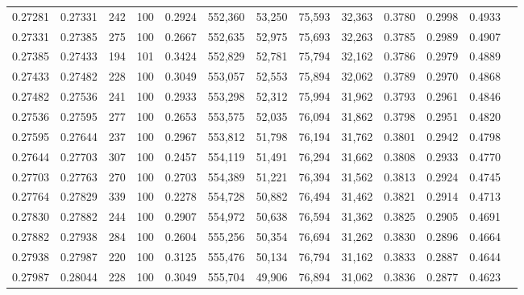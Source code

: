 \begin{tabular}{rrrrrrrrrrrrr}
0.27281 & 0.27331 &   242 & 100 &                                     0.2924 & 552,360 &  53,250 &  75,593 &  32,363 & 0.3780 & 0.2998 & 0.4933 \\
0.27331 & 0.27385 &   275 & 100 &                                     0.2667 & 552,635 &  52,975 &  75,693 &  32,263 & 0.3785 & 0.2989 & 0.4907 \\
0.27385 & 0.27433 &   194 & 101 &                                     0.3424 & 552,829 &  52,781 &  75,794 &  32,162 & 0.3786 & 0.2979 & 0.4889 \\
0.27433 & 0.27482 &   228 & 100 &                                     0.3049 & 553,057 &  52,553 &  75,894 &  32,062 & 0.3789 & 0.2970 & 0.4868 \\
0.27482 & 0.27536 &   241 & 100 &                                     0.2933 & 553,298 &  52,312 &  75,994 &  31,962 & 0.3793 & 0.2961 & 0.4846 \\
0.27536 & 0.27595 &   277 & 100 &                                     0.2653 & 553,575 &  52,035 &  76,094 &  31,862 & 0.3798 & 0.2951 & 0.4820 \\
0.27595 & 0.27644 &   237 & 100 &                                     0.2967 & 553,812 &  51,798 &  76,194 &  31,762 & 0.3801 & 0.2942 & 0.4798 \\
0.27644 & 0.27703 &   307 & 100 &                                     0.2457 & 554,119 &  51,491 &  76,294 &  31,662 & 0.3808 & 0.2933 & 0.4770 \\
0.27703 & 0.27763 &   270 & 100 &                                     0.2703 & 554,389 &  51,221 &  76,394 &  31,562 & 0.3813 & 0.2924 & 0.4745 \\
0.27764 & 0.27829 &   339 & 100 &                                     0.2278 & 554,728 &  50,882 &  76,494 &  31,462 & 0.3821 & 0.2914 & 0.4713 \\
0.27830 & 0.27882 &   244 & 100 &                                     0.2907 & 554,972 &  50,638 &  76,594 &  31,362 & 0.3825 & 0.2905 & 0.4691 \\
0.27882 & 0.27938 &   284 & 100 &                                     0.2604 & 555,256 &  50,354 &  76,694 &  31,262 & 0.3830 & 0.2896 & 0.4664 \\
0.27938 & 0.27987 &   220 & 100 &                                     0.3125 & 555,476 &  50,134 &  76,794 &  31,162 & 0.3833 & 0.2887 & 0.4644 \\
0.27987 & 0.28044 &   228 & 100 &                                     0.3049 & 555,704 &  49,906 &  76,894 &  31,062 & 0.3836 & 0.2877 & 0.4623 \\

\end{tabular}

